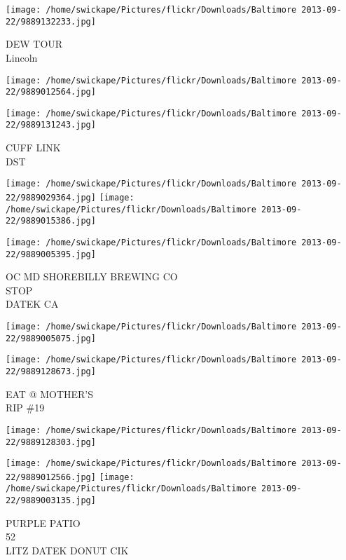 \documentclass[10pt,letterpaper]{article}
\begin{document}
\vspace{0.25in}
\texttt{[image: /home/swickape/Pictures/flickr/Downloads/Baltimore 2013-09-22/9889132233.jpg]}

DEW TOUR\\
Lincoln\\
\pagebreak

\texttt{[image: /home/swickape/Pictures/flickr/Downloads/Baltimore 2013-09-22/9889012564.jpg]}

\vspace{0.25in}
\texttt{[image: /home/swickape/Pictures/flickr/Downloads/Baltimore 2013-09-22/9889131243.jpg]}

CUFF LINK\\
DST\\
\pagebreak

\texttt{[image: /home/swickape/Pictures/flickr/Downloads/Baltimore 2013-09-22/9889029364.jpg]}
\texttt{[image: /home/swickape/Pictures/flickr/Downloads/Baltimore 2013-09-22/9889015386.jpg]}

\vspace{0.25in}
\texttt{[image: /home/swickape/Pictures/flickr/Downloads/Baltimore 2013-09-22/9889005395.jpg]}

OC MD SHOREBILLY BREWING CO\\
STOP\\
DATEK CA\\
\pagebreak

\texttt{[image: /home/swickape/Pictures/flickr/Downloads/Baltimore 2013-09-22/9889005075.jpg]}

\vspace{0.25in}
\texttt{[image: /home/swickape/Pictures/flickr/Downloads/Baltimore 2013-09-22/9889128673.jpg]}

EAT @ MOTHER'S\\
RIP \#19\\
\pagebreak

\texttt{[image: /home/swickape/Pictures/flickr/Downloads/Baltimore 2013-09-22/9889128303.jpg]}

\vspace{0.25in}
\texttt{[image: /home/swickape/Pictures/flickr/Downloads/Baltimore 2013-09-22/9889012566.jpg]}
\texttt{[image: /home/swickape/Pictures/flickr/Downloads/Baltimore 2013-09-22/9889003135.jpg]}

PURPLE PATIO\\
52\\
LITZ DATEK DONUT CIK\\
\pagebreak
\end{document}
